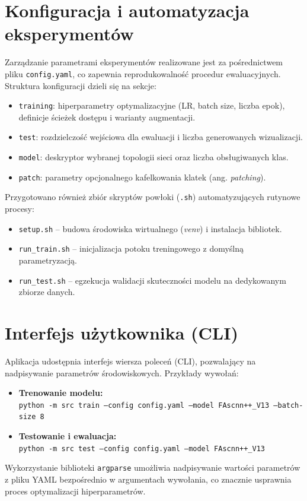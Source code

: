 \section{Konfiguracja i automatyzacja eksperymentów}
Zarządzanie parametrami eksperymentów realizowane jest za pośrednictwem pliku \texttt{config.yaml}, co zapewnia reprodukowalność procedur ewaluacyjnych. Struktura konfiguracji dzieli się na sekcje:
\begin{itemize}
    \item \texttt{training}: hiperparametry optymalizacyjne (LR, batch size, liczba epok), definicje ścieżek dostępu i warianty augmentacji.
    \item \texttt{test}: rozdzielczość wejściowa dla ewaluacji i liczba generowanych wizualizacji.
    \item \texttt{model}: deskryptor wybranej topologii sieci oraz liczba obsługiwanych klas.
    \item \texttt{patch}: parametry opcjonalnego kafelkowania klatek (ang. \textit{patching}).
\end{itemize}

Przygotowano również zbiór skryptów powłoki (\texttt{.sh}) automatyzujących rutynowe procesy:
\begin{itemize}
    \item \texttt{setup.sh} – budowa środowiska wirtualnego (\textit{venv}) i instalacja bibliotek.
    \item \texttt{run\_train.sh} – inicjalizacja potoku treningowego z domyślną parametryzacją.
    \item \texttt{run\_test.sh} – egzekucja walidacji skuteczności modelu na dedykowanym zbiorze danych.
\end{itemize}

\section{Interfejs użytkownika (CLI)}
Aplikacja udostępnia interfejs wiersza poleceń (CLI), pozwalający na nadpisywanie parametrów środowiskowych. Przykłady wywołań:
\begin{itemize}
    \item \textbf{Trenowanie modelu:} \\
    \texttt{python -m src train --config config.yaml --model FAscnn++\_V13 --batch-size 8}
    \item \textbf{Testowanie i ewaluacja:} \\
    \texttt{python -m src test --config config.yaml --model FAscnn++\_V13}
\end{itemize}
Wykorzystanie biblioteki \texttt{argparse} umożliwia nadpisywanie wartości parametrów z pliku YAML bezpośrednio w argumentach wywołania, co znacznie usprawnia proces optymalizacji hiperparametrów.
